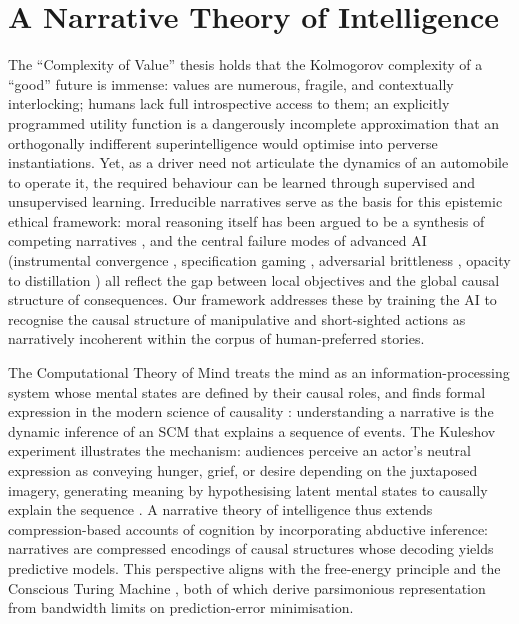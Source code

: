 \documentclass{article}
\theoremstyle{plain}
\theoremstyle{definition}
\theoremstyle{remark}
\begin{document}
\section{A Narrative Theory of Intelligence}

The ``Complexity of Value'' thesis \citep{yudkowsky11} holds that the Kolmogorov complexity of a ``good'' future is immense: values are numerous, fragile, and contextually interlocking; humans lack full introspective access to them; an explicitly programmed utility function is a dangerously incomplete approximation that an orthogonally indifferent superintelligence would optimise into perverse instantiations. Yet, as a driver need not articulate the dynamics of an automobile to operate it, the required behaviour can be learned through supervised and unsupervised learning. Irreducible narratives serve as the basis for this epistemic ethical framework: moral reasoning itself has been argued to be a synthesis of competing narratives \citep{macintyre81}, and the central failure modes of advanced AI (instrumental convergence \citep{bostrom14}, specification gaming \citep{amodei16, bail18, leike17}, adversarial brittleness \citep{shayegani23}, opacity to distillation \citep{goldblum20}) all reflect the gap between local objectives and the global causal structure of consequences. Our framework addresses these by training the AI to recognise the causal structure of manipulative and short-sighted actions as narratively incoherent within the corpus of human-preferred stories.

The Computational Theory of Mind \citep{fodor75, putnam67} treats the mind as an information-processing system whose mental states are defined by their causal roles, and finds formal expression in the modern science of causality \citep{pearl09, pearl95}: understanding a narrative is the dynamic inference of an SCM that explains a sequence of events. The Kuleshov experiment illustrates the mechanism: audiences perceive an actor's neutral expression as conveying hunger, grief, or desire depending on the juxtaposed imagery, generating meaning by hypothesising latent mental states to causally explain the sequence \citep{kuleshov74, bordwell85}. A narrative theory of intelligence thus extends compression-based accounts of cognition \citep{chollet19, maguire15} by incorporating abductive inference: narratives are compressed encodings of causal structures whose decoding yields predictive models. This perspective aligns with the free-energy principle \citep{friston10, rao99} and the Conscious Turing Machine \citep{blum22}, both of which derive parsimonious representation from bandwidth limits on prediction-error minimisation.
\end{document}
